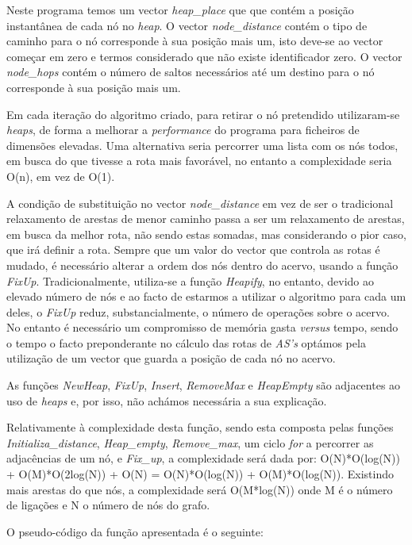 \documentclass[a4paper]{article}
\begin{document}
Neste programa temos um vector \textit{heap\_place} que que contém a posição instantânea de cada nó no \textit{heap}. O vector \textit{node\_distance} contém o tipo de caminho para o nó corresponde à sua posição mais um, isto deve-se ao vector começar em zero e termos considerado que não existe identificador zero. O vector \textit{node\_hops} contém o número de saltos necessários até um destino para o nó corresponde à sua posição mais um.

Em cada iteração do algoritmo criado, para retirar o nó pretendido utilizaram-se \textit{heaps}, de forma a melhorar a \textit{performance} do programa para ficheiros de dimensões elevadas. Uma alternativa seria percorrer uma lista com os nós todos, em busca do que tivesse a rota mais favorável, no entanto a complexidade seria O(n), em vez de O(1).

A condição de substituição no vector \textit{node\_distance} em vez de ser o tradicional relaxamento de arestas de menor caminho passa a ser um relaxamento de arestas, em busca da melhor rota, não sendo estas somadas, mas considerando o pior caso, que irá definir a rota. Sempre que um valor do vector que controla as rotas é mudado, é necessário alterar a ordem dos nós dentro do acervo, usando a função \textit{FixUp}. Tradicionalmente, utiliza-se a função \textit{Heapify}, no entanto, devido ao elevado número de nós e ao facto de estarmos a utilizar o algoritmo para cada um deles, o \textit{FixUp} reduz, substancialmente, o número de operações sobre o acervo. No entanto é necessário um compromisso de memória gasta \textit{versus} tempo, sendo o tempo o facto preponderante no cálculo das rotas de \textit{AS's} optámos pela utilização de um vector que guarda a posição de cada nó no acervo.

As funções \textit{NewHeap}, \textit{FixUp}, \textit{Insert}, \textit{RemoveMax} e \textit{HeapEmpty} são adjacentes ao uso de \textit{heaps} e, por isso, não achámos necessária a sua explicação.

Relativamente à complexidade desta função, sendo esta composta pelas funções \textit{Initializa\_distance}, \textit{Heap\_empty}, \textit{Remove\_max}, um ciclo \textit{for} a percorrer as adjacências de um nó, e \textit{Fix\_up}, a complexidade será dada por: O(N)*O(log(N)) + O(M)*O(2log(N)) + O(N) = O(N)*O(log(N)) + O(M)*O(log(N)). Existindo mais arestas do que nós, a complexidade será O(M*log(N)) onde M é o número de ligações e N o número de nós do grafo.

O pseudo-código da função apresentada é o seguinte:
\end{document}
